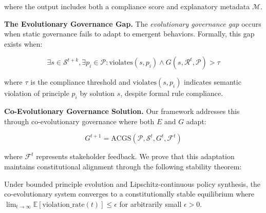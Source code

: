 \documentclass[sigconf,natbib]{acmart}
\begin{document}
where the output includes both a compliance score and explanatory metadata $\mathcal{M}$.

\textbf{The Evolutionary Governance Gap.} The \textit{evolutionary governance gap} occurs when static governance fails to adapt to emergent behaviors. Formally, this gap exists when:

$$\exists s \in \mathcal{S}^{t+k}, \exists p_i \in \mathcal{P}: \text{violates}(s, p_i) \land G(s, \mathcal{R}^t, \mathcal{P}) > \tau$$

where $\tau$ is the compliance threshold and $\text{violates}(s, p_i)$ indicates semantic violation of principle $p_i$ by solution $s$, despite formal rule compliance.

\textbf{Co-Evolutionary Governance Solution.} Our framework addresses this through co-evolutionary governance where both $E$ and $G$ adapt:

$$G^{t+1} = \text{ACGS}(\mathcal{P}, \mathcal{S}^t, G^t, \mathcal{F}^t)$$

where $\mathcal{F}^t$ represents stakeholder feedback. We prove that this adaptation maintains constitutional alignment through the following stability theorem:

\begin{theorem}
\label{thm:constitutional_stability}
Under bounded principle evolution and Lipschitz-continuous policy synthesis, the co-evolutionary system converges to a constitutionally stable equilibrium where $\lim_{t \to \infty} \mathbb{E}[\text{violation\_rate}(t)] \leq \epsilon$ for arbitrarily small $\epsilon > 0$.
\end{theorem}
\end{document}
